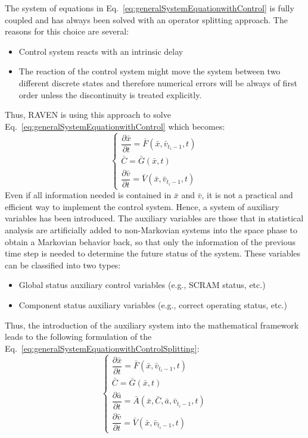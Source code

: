 \documentclass{anstrans}
\begin{document}
The system of equations in Eq.~\ref{eq:generalSystemEquationwithControl} is fully coupled and has always been solved with an operator splitting approach. The reasons for this choice are several:
\begin{itemize}
\item Control system reacts with an intrinsic delay
\item The reaction of the control system might move the system between two different discrete states and
therefore numerical errors will be always of first order unless the discontinuity is treated explicitly.
\end{itemize}
Thus, RAVEN is using this approach to solve Eq.~\ref{eq:generalSystemEquationwithControl} which becomes:
\begin{equation}
\begin{cases} 
\dfrac{\partial \bar{x}}{\partial t} = \bar{F}(\bar{x},\bar{v}_{t_{i}-1},t) \\
\bar{C} = \bar{G}(\bar{x},t) \\ 
\dfrac{\partial \bar{v}}{\partial t} = \bar{V}(\bar{x},\bar{v}_{t_{i}-1},t) 
\end{cases}
\label{eq:generalSystemEquationwithControlSplitting}
\end{equation}
Even if all information needed is contained in $\bar{x}$ and $\bar{v}$, it is not a practical and efficient way to implement the control system. Hence, a system of auxiliary variables has been introduced.
The auxiliary variables are those that in statistical analysis are artificially added to non-Markovian systems into the space phase to obtain a Markovian behavior back, so that only the information of the previous time step is needed to determine the future status of the system.
These variables can be classified into two types: 
\begin{itemize}
\item Global status auxiliary control variables (e.g., SCRAM status, etc.)
\item Component status auxiliary variables (e.g., correct operating status, etc.)
\end{itemize}
Thus, the introduction of the auxiliary system into the mathematical framework leads to the following formulation of the Eq.~\ref{eq:generalSystemEquationwithControlSplitting}:
\begin{equation}
\begin{cases} 
\dfrac{\partial \bar{x}}{\partial t} = \bar{F}(\bar{x},\bar{v}_{t_{i}-1},t) \\
\bar{C} = \bar{G}(\bar{x},t) \\ 
\dfrac{\partial \bar{a}}{\partial t} = \bar{A}(\bar{x},\bar{C},\bar{a},\bar{v}_{t_{i}-1},t) \\
\dfrac{\partial \bar{v}}{\partial t} = \bar{V}(\bar{x},\bar{v}_{t_{i}-1},t) 
\end{cases}
\label{eq:generalSystemEquationwithControlSplittingAndAux}
\end{equation}
\end{document}
